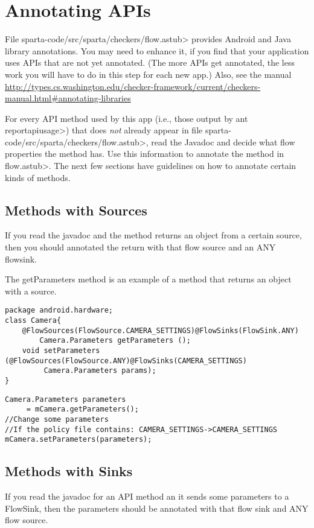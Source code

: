 \section{Annotating APIs\label{sec:annotatedAPI}}

File \<sparta-code/src/sparta/checkers/flow.astub> provides Android and Java
library annotations.  You may need to enhance it, if you find that your application
uses APIs that are not yet annotated.
(The  more APIs get annotated, the less work you will have to do in this
step for each new app.) 
Also, see the manual 
\url{http://types.cs.washington.edu/checker-framework/current/checkers-manual.html#annotating-libraries}

For every API method used by this app (i.e., those output by \<ant
reportapiusage>) that does \emph{not} already appear in file
\<sparta-code/src/sparta/checkers/flow.astub>, read the Javadoc and decide what flow properties the method
has.  Use this information to annotate the method in \<flow.astub>.  The next few sections have guidelines on
how to annotate certain kinds of methods. 




\subsection{Methods with Sources}
If you read the javadoc and the method returns an object from a certain source, then you should annotated 
the return with that flow source and an ANY flowsink.

The getParameters method is an example of a method that returns an object with a source.
\begin{Verbatim}
package android.hardware;
class Camera{
    @FlowSources(FlowSource.CAMERA_SETTINGS)@FlowSinks(FlowSink.ANY)
        Camera.Parameters getParameters ();
    void setParameters (@FlowSources(FlowSource.ANY)@FlowSinks(CAMERA_SETTINGS) 
         Camera.Parameters params);
}
\end{Verbatim}

\begin{Verbatim}
Camera.Parameters parameters
     = mCamera.getParameters();
//Change some parameters
//If the policy file contains: CAMERA_SETTINGS->CAMERA_SETTINGS
mCamera.setParameters(parameters);
\end{Verbatim}



\subsection{Methods with Sinks}
If you read the javadoc for an API method an it sends some parameters to a FlowSink, then the parameters
should be annotated with that flow sink and ANY flow source.  


